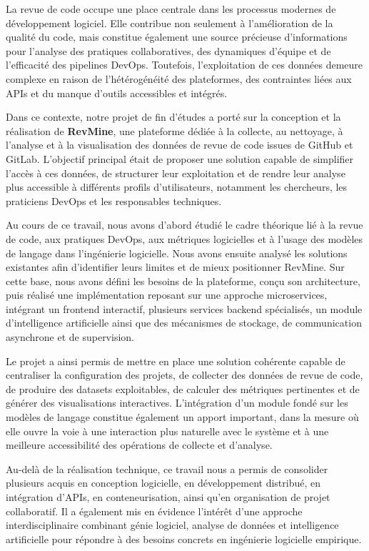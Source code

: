
La revue de code occupe une place centrale dans les processus modernes de développement logiciel. Elle contribue non seulement à l’amélioration de la qualité du code, mais constitue également une source précieuse d’informations pour l’analyse des pratiques collaboratives, des dynamiques d’équipe et de l’efficacité des pipelines DevOps. Toutefois, l’exploitation de ces données demeure complexe en raison de l’hétérogénéité des plateformes, des contraintes liées aux APIs et du manque d’outils accessibles et intégrés.

Dans ce contexte, notre projet de fin d’études a porté sur la conception et la réalisation de \textbf{RevMine}, une plateforme dédiée à la collecte, au nettoyage, à l’analyse et à la visualisation des données de revue de code issues de GitHub et GitLab. L’objectif principal était de proposer une solution capable de simplifier l’accès à ces données, de structurer leur exploitation et de rendre leur analyse plus accessible à différents profils d’utilisateurs, notamment les chercheurs, les praticiens DevOps et les responsables techniques.

Au cours de ce travail, nous avons d’abord étudié le cadre théorique lié à la revue de code, aux pratiques DevOps, aux métriques logicielles et à l’usage des modèles de langage dans l’ingénierie logicielle. Nous avons ensuite analysé les solutions existantes afin d’identifier leurs limites et de mieux positionner RevMine. Sur cette base, nous avons défini les besoins de la plateforme, conçu son architecture, puis réalisé une implémentation reposant sur une approche microservices, intégrant un frontend interactif, plusieurs services backend spécialisés, un module d’intelligence artificielle ainsi que des mécanismes de stockage, de communication asynchrone et de supervision.

Le projet a ainsi permis de mettre en place une solution cohérente capable de centraliser la configuration des projets, de collecter des données de revue de code, de produire des datasets exploitables, de calculer des métriques pertinentes et de générer des visualisations interactives. L’intégration d’un module fondé sur les modèles de langage constitue également un apport important, dans la mesure où elle ouvre la voie à une interaction plus naturelle avec le système et à une meilleure accessibilité des opérations de collecte et d’analyse.

Au-delà de la réalisation technique, ce travail nous a permis de consolider plusieurs acquis en conception logicielle, en développement distribué, en intégration d’APIs, en conteneurisation, ainsi qu’en organisation de projet collaboratif. Il a également mis en évidence l’intérêt d’une approche interdisciplinaire combinant génie logiciel, analyse de données et intelligence artificielle pour répondre à des besoins concrets en ingénierie logicielle empirique.

